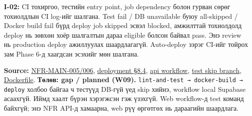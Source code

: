 \documentclass[
  11pt,
  a4paper,
]{article}
\begin{document}
\textbf{I-02:} CI тохиргоо, тестийн entry point, job dependency болон
гурван сөрөг тохиолдлын CI log-ийг шалгана. Test fail / DB unavailable
буюу all-skipped / Docker build fail бүрд deploy job skipped эсвэл
blocked, амжилттай тохиолдолд deploy нь зөвхөн хоёр шалгалтын дараа
eligible болсон байвал pass. Энэ review нь production deploy ажиллуулах
шаардлагагүй. Auto-deploy зэрэг CI-ийг тойрох зам Phase 6-д хаагдсан
эсэхийг мөн шалгана.

\textbf{Source:}
\href{../../phase-0/02-requirements.md}{NFR-MAIN-005/006},
\href{../../phase-0/09-deployment.md}{deployment §8.4},
\href{../../../.github/workflows/api-deploy.yml}{api workflow},
\href{../../../backend/api/tests/inquiry-cart.integration.test.ts}{test
skip branch}, \href{../../../backend/api/Dockerfile}{Dockerfile}.
\textbf{Төлөв: gap / planned (W09).}
\nolinkurl{lint-and-test → docker-build → deploy} холбоо байгаа ч
тестүүд DB-гүй үед skip хийнэ, workflow local Supabase асаахгүй. Иймд
хаалт бүрэн хэрэгжсэн гэж үзэхгүй. Web workflow-д test команд байхгүй;
энэ NFR API-д хамаарна, web рүү өргөтгөх нь дараагийн шаардлага.
\end{document}
